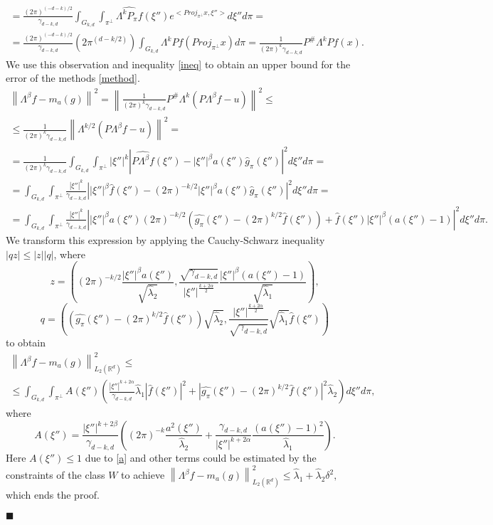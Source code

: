 \documentclass[12pt]{iopart}
\newenvironment{proof}
{\par\noindent{\bf Proof}}
{\hfill$\scriptstyle\blacksquare$}
\begin{document}
\begin{proof}
\begin{multline*}
		= \frac{(2\pi)^{(-d-k)/2}}{\gamma_{d-k,d}}\int_{G_{k,d}}\int_{\pi^\perp}\widehat{\Lambda^kP_\pi f}(\xi'')e^{<Proj_{\pi^\perp}x,\xi''>}d\xi''d\pi = \\
		= \frac{(2\pi)^{(-d-k)/2}}{\gamma_{d-k,d}}(2\pi^{(d-k/2)})\int_{G_{k,d}}\Lambda^kP f(Proj_{\pi^\perp}x)d\pi = \frac{1}{(2\pi)^k\gamma_{d-k,d}}P^\#\Lambda^kPf(x).
		\end{multline*}
		We use this observation and inequality \eqref{ineq} to obtain an upper bound for the error of the methods \eqref{method}.
		\begin{multline*}
		\left\|\Lambda^\beta f-m_a(g)\right\|^2=\left\|\frac{1}{(2\pi)^k\gamma_{d-k,d}}P^\#\Lambda^k(P\Lambda^\beta f-u)\right\|^2\leqslant\\
		\leqslant\frac{1}{(2\pi)^k\gamma_{d-k,d}}\left\|\Lambda^{k/2}(P\Lambda^\beta f-u)\right\|^2=\\
		=\frac{1}{(2\pi)^k\gamma_{d-k,d}}\int_{G_{k,d}}\int_{\pi^\perp}|\xi''|^k\left|\widehat{P\Lambda^\beta f}(\xi'')-|\xi''|^\beta a(\xi'')\widehat g_\pi(\xi'')\right|^2d\xi'' d\pi=\\
		=\int_{G_{k,d}}\int_{\pi^\perp}\frac{|\xi''|^k}{\gamma_{d-k,d}}\left||\xi''|^\beta\widehat{f}(\xi'')-(2\pi)^{-k/2}|\xi''|^\beta a(\xi'')\widehat g_\pi(\xi'')\right|^2d\xi'' d\pi=\\
		=\int_{G_{k,d}}\int_{\pi^\perp}\frac{|\xi''|^k}{\gamma_{d-k,d}}\left||\xi''|^\beta a(\xi'')(2\pi)^{-k/2}\left(\widehat{g_\pi }(\xi'')-(2\pi)^{k/2}\widehat f(\xi'' )\right)+\widehat f(\xi'')|\xi''|^\beta\left(a(\xi'')-1\right)\right|^2d\xi''d\pi .
		\end{multline*}
		We transform this expression by applying the Cauchy-Schwarz inequality $|qz|\leqslant |z||q|$, where
		\[
		z=\left((2\pi)^{-k/2}\frac{|\xi''|^\beta a(\xi'')}{\sqrt{\widehat\lambda_2}},\frac{\sqrt{\gamma_{d-k,d}}}{|\xi''|^{\frac{k+2\alpha}{2}}}\frac{|\xi''|^\beta(a(\xi'')-1)}{\sqrt{\widehat\lambda_1}}\right),
		\]
		\[
		q=\left(\left(\widehat{g_\pi }(\xi'')-(2\pi)^{k/2}\widehat
		f(\xi'' )\right)\sqrt{\widehat\lambda_2},\frac{|\xi''|^{\frac{k+2\alpha}{2}}}{\sqrt{\gamma_{d-k,d}}}\sqrt{\widehat\lambda_1}\widehat f(\xi'' )\right)
		\]
		to obtain
		\begin{multline*}  
		\left\|\Lambda^\beta f-m_a(g)\right\|^2_{L_2(\mathbb R^d)}\leqslant  \\
		\leqslant \int_{G_{k,d}}\int_{\pi^\perp}
		A(\xi'')\left(\frac{|\xi''|^{k+2\alpha}}{\gamma_{d-k,d}}\widehat\lambda_1|\widehat f(\xi'')|^2+\left|\widehat{g_\pi}(\xi'')-(2\pi)^{k/2}\widehat f(\xi'')\right|^2\widehat\lambda_2\right)d\xi''d\pi,
		\end{multline*}
		where
		\[
		A(\xi'')=\frac{|\xi''|^{k+2\beta}}{\gamma_{d-k,d}}\left((2\pi)^{-k}\frac{a^2(\xi'')}{\widehat\lambda_2}+\frac{\gamma_{d-k,d}}{|\xi''|^{k+2\alpha}}\frac{(a(\xi'')-1)^2}{\widehat\lambda_1}\right).
		\]
		Here $A(\xi'')\leqslant 1$ due to \eqref{a} and other terms could be estimated by the constraints of the class $W$ to achieve $\left\|\Lambda^\beta f-m_a(g)\right\|^2_{L_2(\mathbb R^d)}\leqslant
		\widehat\lambda_1+\widehat\lambda_2\delta^2,$ which ends the proof.
		
	\end{proof}
	
\end{document}
